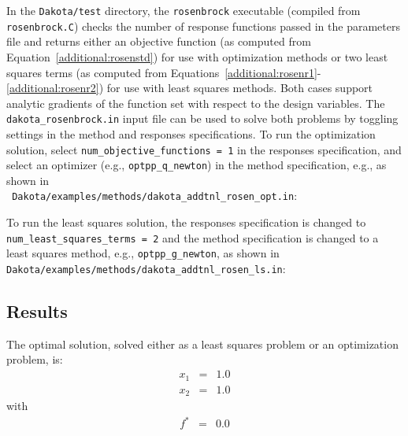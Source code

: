In the \texttt{Dakota/test} directory, the \texttt{rosenbrock}
executable (compiled from \texttt{rosenbrock.C}) checks the number of
response functions passed in the parameters file and returns either an
objective function (as computed from
Equation~\ref{additional:rosenstd}) for use with optimization methods
or two least squares terms (as computed from
Equations~\ref{additional:rosenr1}-\ref{additional:rosenr2}) for use
with least squares methods.  Both cases support analytic gradients of
the function set with respect to the design variables. The
\texttt{dakota\_rosenbrock.in} input file can be used to solve both
problems by toggling settings in the method and responses
specifications. To run the optimization solution, select
\texttt{num\_objective\_functions = 1} in the responses specification,
and select an optimizer (e.g., \texttt{optpp\_q\_newton}) in the
method specification, e.g., as shown in \\ {\tt
Dakota/examples/methods/dakota\_addtnl\_rosen\_opt.in}:
\begin{center}
  \begin{small}
    \begin{bigbox}
    \end{bigbox}
  \end{small}
\end{center}

To run the least squares solution, the responses specification is
changed to \texttt{num\_least\_squares\_terms = 2} and the method
specification is changed to a least squares method, e.g.,
\texttt{optpp\_g\_newton}, as shown in {\tt
Dakota/examples/methods/dakota\_addtnl\_rosen\_ls.in}:
\begin{center}
  \begin{small}
    \begin{bigbox}
    \end{bigbox}
  \end{small}
\end{center}

\subsection{Results}\label{additional:rosenbrock:results}

The optimal solution, solved either as a least squares problem or an
optimization problem, is:
\begin{eqnarray*}
    x_1 &=& 1.0 \\
    x_2 &=& 1.0
\end{eqnarray*}
with
\begin{eqnarray*}
    f^{\ast} &=& 0.0
\end{eqnarray*}

